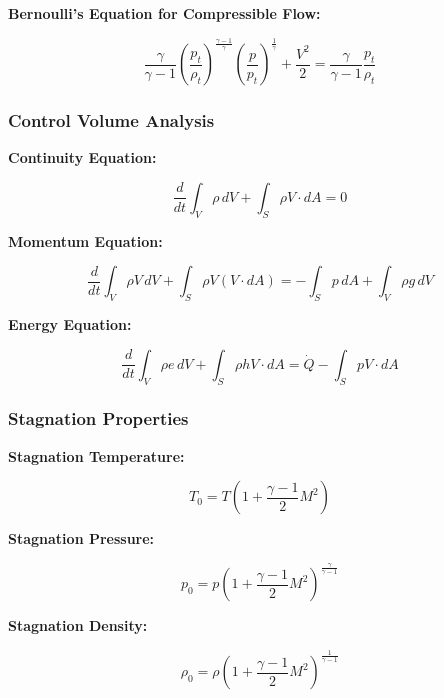 \textbf{Bernoulli's Equation for Compressible Flow:}

\begin{equation}
	\frac{\gamma}{\gamma - 1} \left( \frac{p_t}{\rho_t} \right)^{\frac{\gamma - 1}{\gamma}} \left( \frac{p}{p_t} \right)^{\frac{1}{\gamma}} + \frac{V^2}{2} = \frac{\gamma}{\gamma - 1} \frac{p_t}{\rho_t}
\end{equation}

\subsubsection{Control Volume Analysis}

\textbf{Continuity Equation:}

\begin{equation}
	\frac{d}{dt} \int_V \rho \, dV + \int_S \rho V \cdot dA = 0
\end{equation}

\textbf{Momentum Equation:}

\begin{equation}
	\frac{d}{dt} \int_V \rho V \, dV + \int_S \rho V (V \cdot dA) = - \int_S p \, dA + \int_V \rho g \, dV
\end{equation}

\textbf{Energy Equation:}

\begin{equation}
	\frac{d}{dt} \int_V \rho e \, dV + \int_S \rho h V \cdot dA = \dot{Q} - \int_S p V \cdot dA
\end{equation}

\subsubsection{Stagnation Properties}

\textbf{Stagnation Temperature:}

\begin{equation}
	T_0 = T \left( 1 + \frac{\gamma - 1}{2} M^2 \right)
\end{equation}

\textbf{Stagnation Pressure:}

\begin{equation}
	p_0 = p \left( 1 + \frac{\gamma - 1}{2} M^2 \right)^{\frac{\gamma}{\gamma - 1}}
\end{equation}

\textbf{Stagnation Density:}

\begin{equation}
	\rho_0 = \rho \left( 1 + \frac{\gamma - 1}{2} M^2 \right)^{\frac{1}{\gamma - 1}}
\end{equation}

